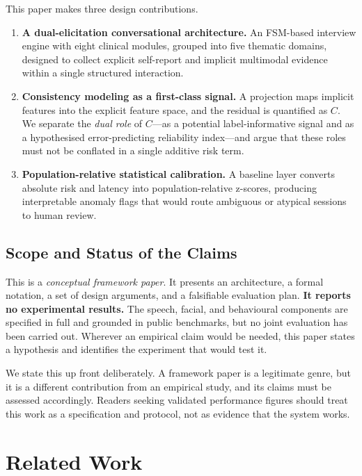 \documentclass[12pt]{article}
\begin{document}
This paper makes three design contributions.
\begin{enumerate}
  \item \textbf{A dual-elicitation conversational architecture.} An
        FSM-based interview engine with eight clinical modules, grouped
        into five thematic domains, designed to collect explicit
        self-report and implicit multimodal evidence within a single
        structured interaction.
  \item \textbf{Consistency modeling as a first-class signal.} A
        projection maps implicit features into the explicit feature
        space, and the residual is quantified as $C$. We separate the
        \emph{dual role} of $C$---as a potential label-informative
        signal and as a hypothesised error-predicting reliability
        index---and argue that these roles must not be conflated in a
        single additive risk term.
  \item \textbf{Population-relative statistical calibration.} A
        baseline layer converts absolute risk and latency into
        population-relative z-scores, producing interpretable anomaly
        flags that would route ambiguous or atypical sessions to human
        review.
\end{enumerate}

\subsection{Scope and Status of the Claims}
\label{sec:scope}

This is a \emph{conceptual framework paper}. It presents an
architecture, a formal notation, a set of design arguments, and a
falsifiable evaluation plan. \textbf{It reports no experimental
results.} The speech, facial, and behavioural components are specified
in full and grounded in public benchmarks, but no joint evaluation has
been carried out. Wherever an empirical claim would be needed, this
paper states a hypothesis and identifies the experiment that would test
it.

We state this up front deliberately. A framework paper is a legitimate
genre, but it is a different contribution from an empirical study, and
its claims must be assessed accordingly. Readers seeking validated
performance figures should treat this work as a specification and
protocol, not as evidence that the system works.

\section{Related Work}
\end{document}
